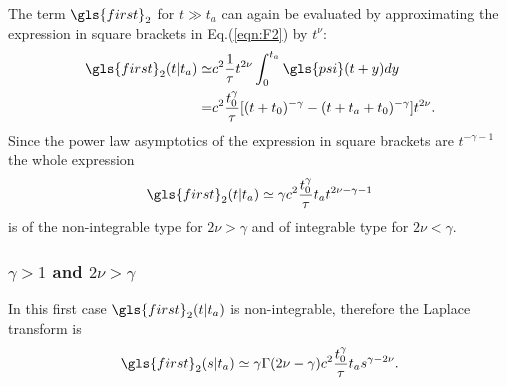The term $\gls{first}_2$ for $t \gg t_a$ can again be 
evaluated by approximating the expression in square brackets in Eq.(\ref{eqn:F2}) by $t^\nu$: 
\begin{align}
 \gls{first}_2(t|t_a) \simeq & c^2  \frac{1}{\tau} t^{2\nu} \int_0^{t_a} \gls{psi}(t+y)dy \\
 =& c^2 \frac{ t_0^\gamma }{\tau} [(t+t_0)^{-\gamma}-(t+t_a+t_0)^{-\gamma}]t^{2\nu}. 
\label{F2lagrer1}
\end{align}
Since the power law asymptotics of the expression in square brackets are $t^{-\gamma -1}$ the whole expression
\begin{equation}
 \gls{first}_2(t|t_a) \simeq \gamma c^2  \frac{t_0^\gamma }{\tau}t_a t^{2\nu-\gamma -1}
\end{equation}
is of the non-integrable type for $2\nu > \gamma$ and of integrable type for $2 \nu < \gamma$.

\subsubsection{$\gamma>1$ and $2\nu > \gamma$} 
In this first case $\gls{first}_2(t|t_a)$ is non-integrable, therefore the Laplace transform is 
\begin{equation}
 \gls{first}_2(s|t_a) \simeq \gamma\Gamma (2\nu-\gamma) c^2\frac{t_0^\gamma}{\tau}t_a s^{\gamma - 2\nu}.
\end{equation}

